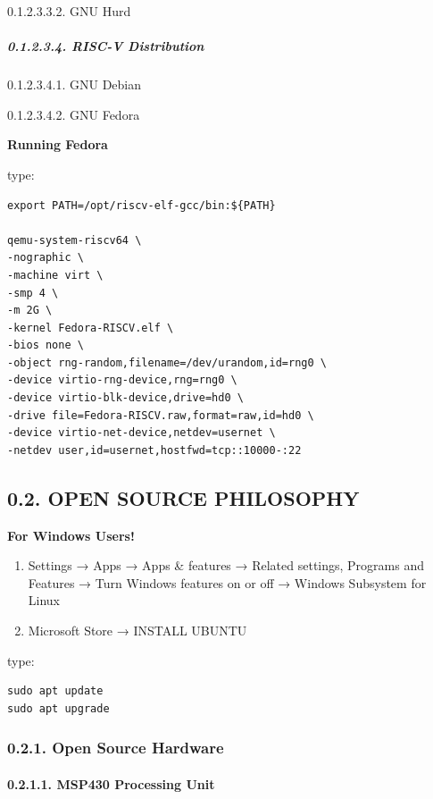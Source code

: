 \documentclass[
]{article}
\begin{document}
0.1.2.3.3.2. GNU Hurd

\hypertarget{risc-v-distribution}{%
\subparagraph{0.1.2.3.4. RISC-V
Distribution}\label{risc-v-distribution}}

0.1.2.3.4.1. GNU Debian

0.1.2.3.4.2. GNU Fedora

\textbf{Running Fedora}

type:

\begin{verbatim}
export PATH=/opt/riscv-elf-gcc/bin:${PATH}

qemu-system-riscv64 \
-nographic \
-machine virt \
-smp 4 \
-m 2G \
-kernel Fedora-RISCV.elf \
-bios none \
-object rng-random,filename=/dev/urandom,id=rng0 \
-device virtio-rng-device,rng=rng0 \
-device virtio-blk-device,drive=hd0 \
-drive file=Fedora-RISCV.raw,format=raw,id=hd0 \
-device virtio-net-device,netdev=usernet \
-netdev user,id=usernet,hostfwd=tcp::10000-:22
\end{verbatim}

\hypertarget{open-source-philosophy}{%
\subsection{0.2. OPEN SOURCE PHILOSOPHY}\label{open-source-philosophy}}

\textbf{For Windows Users!}

\begin{enumerate}
\def\labelenumi{\arabic{enumi}.}
\item
  Settings → Apps → Apps \& features → Related settings, Programs and
  Features → Turn Windows features on or off → Windows Subsystem for
  Linux
\item
  Microsoft Store → INSTALL UBUNTU
\end{enumerate}

type:

\begin{verbatim}
sudo apt update
sudo apt upgrade
\end{verbatim}

\hypertarget{open-source-hardware}{%
\subsubsection{0.2.1. Open Source Hardware}\label{open-source-hardware}}

\hypertarget{msp430-processing-unit}{%
\paragraph{0.2.1.1. MSP430 Processing
Unit}\label{msp430-processing-unit}}
\end{document}
